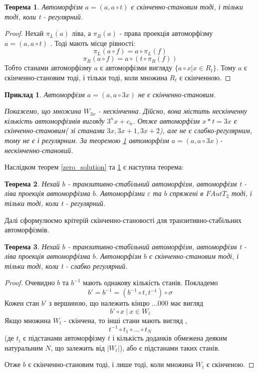 \documentclass[a4paper,12pt]{article} \usepackage{a4wide}
\numberwithin{equation}{subsection}
\newtheorem{theorem}{Теорема}[subsection]
\newtheorem{example}{Приклад}[subsection]
\begin{document}
\begin{theorem}
  \label{aat}
  Автоморфізм $a=(a,a\circ t)$ є скінченно-становим тоді, і тільки
  тоді, коли t - регулярний.
\end{theorem}
\begin{proof}
  Нехай $\pi_L(a) $ ліва, а $\pi_R(a)$ - права проекція автоморфізму
  $a=(a,a\circ t)$ . Тоді мають місце рівності:
$$\pi_L(a\circ f) = a \circ \pi_L(f)$$ 
$$\pi_R(a\circ f) = a \circ (t \circ \pi_R(f))$$ 
Тобто станами автоморфізму $a$ є автоморфізми вигляду $\{a\circ x |
x\in R_t\}$. Тому $a$ є скінченно-становим тоді, і тільки тоді, коли
множина $R_t$ є скінченною.
\end{proof}
\begin{example}
  \label{exmpl_a3x}
  Автоморфізм $a=(a,a\circ 3x)$ не є скінченно-становим.
 
  Покажемо, що множина $W_{3x}$ - нескінченна. Дійсно, вона містить
  нескінченну кількість автоморфізмів вигляду $3^nx+c_n$. Отже
  автоморфізм $x*t = 3x $ є скінченно-становим( зі станами
  $3x,3x+1,3x+2$), але не є слабко-регулярним, тому не є і
  регулярним. За теоремою \ref{aat} автоморфізм $a=(a,a\circ 3x)$-
  нескінченно-становий.
\end{example}

Наслідком теорем \ref{zero_solution} та \ref{aat} є наступна теорема:
\begin{theorem}
  \label{SprStTr}
  Нехай $b$ - транзитивно-стабільний автоморфізм, автоморфізм t - ліва
  проекція автоморфізма $b$.  Автоморфізми $\varepsilon$ та $b$
  спряжені в $FAutT_2$ тоді, і тільки тоді, коли t - регулярний.
\end{theorem}

Далі сформулюємо крітерій скінченно-становості для
транзитивно-стабільних автоморфізмів.
\begin{theorem}
  \label{week_regular_fs}
  Нехай $b$ - транзитивно-стабільний автоморфізм, автоморфізм t - ліва
  проекція автоморфізма $b$.  Автоморфізм $b$ є скінченно-становим
  тоді, і тільки тоді, коли t - слабко регулярний.
\end{theorem}
\begin{proof}
  Очевидно $b$ та $b^{-1}$ мають однакову кількість
  станів. Покладемо $$b' = b^{-1}=(b^{-1}\circ t, t^{-1})\circ
  \sigma$$ Кожен стан $b'$ з вершиною, що належить кінцю ...000 має
  вигляд
$$b'\circ x\ |\ x\in W_t$$ Якщо множина $W_t$ - скінчена, то інші стани мають вигляд
, $$t^{-1}\circ t_1 \circ ... \circ t_N$$ (де $t_i$ є підстанами
автоморфізму $t$ і кількість доданків обмежена деяким натуральним $N$,
що залежить від $|W_t|$), або є підстанами таких станів.

Отже $b$ є скінченно-становим тоді, і лише тоді, коли множина $W_t$ є
скінченою.

\end{proof}
  
\end{document}
